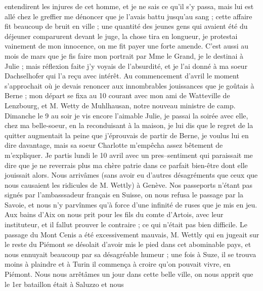 \documentclass[12pt]{article}
\begin{document}
 entendirent les injures de cet homme, et je ne sais ce
qu’il s’y passa, mais lui est allé chez le greffier me dénoncer que je l’avais battu jusqu’au sang ;
cette affaire fit beaucoup de bruit en ville ; une quantité des jeunes gens qui avaient été du
déjeuner comparurent devant le juge, la chose tira en longueur, je protestai vainement de mon
innocence, on me fit payer une forte amende. C’est aussi au mois de mars que je fis faire mon
portrait par Mme le Grand, je le destinai à Julie ; mais réflexion faite j’y voyais de l’absurdité,
et je l’ai donné à ma soeur Dachselhofer qui l’a reçu avec intérêt. Au commencement d’avril le
moment s’approchait où je devais renoncer aux innombrables jouissances que je goûtais à Berne ; mon
départ se fixa au 10 courant avec mon ami de Watteville de Lenzbourg, et M. Wetty de Muhlhausan,
notre nouveau ministre de camp. Dimanche le 9 au soir je vis encore l’aimable Julie, je passai la
soirée avec elle, chez ma belle-soeur, en la reconduisant à la maison, je lui dis que le regret de
la quitter augmentait la peine que j’éprouvais de partir de Berne, je voulus lui en dire davantage,
mais sa soeur Charlotte m’empêcha assez bêtement de m’expliquer. Je partis lundi le 10 avril avec un
pres–sentiment qui paraissait me dire que je ne reverrais plus ma chère patrie dans ce parfait
bien-être dont elle jouissait alors. Nous arrivâmes (sans avoir eu d’autres désagréments que ceux
que nous causaient les ridicules de M. Wettly) à Genève. Nos passeports n’étant pas signés par
l’ambasssadeur français en Suisse, on nous refusa le passage par la Savoie, et nous n’y parvînmes
qu’à force d’une infinité de ruses que je mis en jeu. Aux bains d’Aix on nous prit pour les fils du
comte d’Artois, avec leur instituteur, et il fallut prouver le contraire ; ce qui n’était pas bien
difficile. Le passage du Mont Cenis a été excessivement mauvais, M. Wettly qui en jugeait sur le
reste du Piémont se désolait d’avoir mis le pied dans cet abominable pays, et nous ennuyait beaucoup
par sa désagréable humeur ; une fois à Suze, il se trouva moins à plaindre et à Turin il commença à
croire qu’on pouvait vivre, en Piémont. Nous nous arrêtâmes un jour dans cette belle ville, on nous
apprit que le 1er bataillon était à Saluzzo et nous
\end{document}
